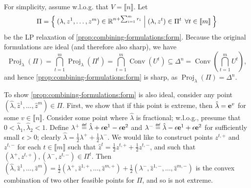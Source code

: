 \documentclass[opre,nonblindrev]{informs3} %
\newcommand{\Conv}{\operatorname{Conv}}
\newcommand{\Proj}{\operatorname{Proj}}
\newcommand\defeq{\mathrel{\overset{\makebox[0pt]{\mbox{\normalfont\tiny\sffamily def}}}{=}}}
\begin{document}
\begin{APPENDICES}
        For simplicity, assume w.l.o.g. that $V = \llbracket n \rrbracket$. Let \[
            \Pi = \Set{(\lambda,z^1,\ldots,z^m)\in \mathbb{R}^{n+\sum_{i=1}^m r_i} | (\lambda,z^t) \in \Pi^t \:\: \forall t \in \llbracket m \rrbracket}
        \]
       be the LP relaxation of \eqref{prop:combining-formulations:form}. Because the original formulations are ideal (and therefore also sharp), we have
        \[
            \Proj_\lambda(\Pi) = \bigcap_{t=1}^m \Proj_\lambda(\Pi^t) = \bigcap_{t=1}^m \Conv(U^t) \subseteq \Delta^n = \Conv\left(\bigcap_{t=1}^m U^t \right),
        \]
        and hence \eqref{prop:combining-formulations:form} is sharp, as $\Proj_\lambda(\Pi)= \Delta^n$.

        To show \eqref{prop:combining-formulations:form} is also ideal, consider any point $(\hat{\lambda},\hat{z}^1,\ldots,\hat{z}^m) \in \Pi$. First, we show that if this point is extreme, then $\hat{\lambda} = {\bf e}^v$ for some $v \in \llbracket n \rrbracket$. Consider some point where $\hat{\lambda}$ is fractional; w.l.o.g., presume that $0 < \hat{\lambda}_1, \hat{\lambda}_2 < 1$. Define $\lambda^+ \defeq \hat{\lambda} + \epsilon {\bf e}^1 - \epsilon {\bf e}^2$ and $\lambda^- \defeq \hat{\lambda} - \epsilon {\bf e}^1 + \epsilon {\bf e}^2$ for sufficiently small $\epsilon > 0$; clearly $\hat{\lambda} = \frac{1}{2}\lambda^+ + \frac{1}{2}\lambda^-$. We would like to construct points $z^{t,+}$ and $z^{t,-}$ for each $t \in \llbracket m \rrbracket$ such that $\hat{z}^t = \frac{1}{2}z^{t,+} + \frac{1}{2}z^{t,-}$, and such that $(\lambda^+,z^{t,+}), (\lambda^-,z^{t,-}) \in \Pi^t$. Then $(\hat{\lambda},\hat{z}^1,\ldots,\hat{z}^m) = \frac{1}{2}(\lambda^+,\hat{z}^{1,+},\ldots,\hat{z}^{m,+}) + \frac{1}{2}(\lambda^-,\hat{z}^{1,-},\ldots,\hat{z}^{m,-})$ is the convex combination of two other feasible points for $\Pi$, and so is not extreme.


\end{APPENDICES}
\end{document}
